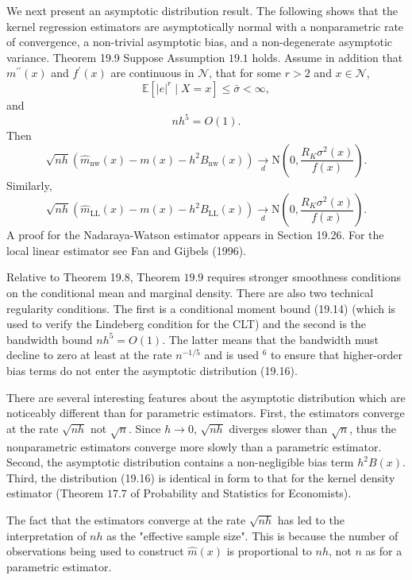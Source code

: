 \documentclass[10pt]{article}
\begin{document}
We next present an asymptotic distribution result. The following shows that the kernel regression estimators are asymptotically normal with a nonparametric rate of convergence, a non-trivial asymptotic bias, and a non-degenerate asymptotic variance. Theorem 19.9 Suppose Assumption $19.1$ holds. Assume in addition that $m^{\prime \prime}(x)$ and $f^{\prime}(x)$ are continuous in $\mathscr{N}$, that for some $r>2$ and $x \in \mathscr{N}$,
$$
\mathbb{E}\left[|e|^{r} \mid X=x\right] \leq \bar{\sigma}<\infty,
$$
and
$$
n h^{5}=O(1) .
$$
Then
$$
\sqrt{n h}\left(\widehat{m}_{\mathrm{nw}}(x)-m(x)-h^{2} B_{\mathrm{nw}}(x)\right) \underset{d}{\longrightarrow} \mathrm{N}\left(0, \frac{R_{K} \sigma^{2}(x)}{f(x)}\right) .
$$
Similarly,
$$
\sqrt{n h}\left(\widehat{m}_{\mathrm{LL}}(x)-m(x)-h^{2} B_{\mathrm{LL}}(x)\right) \underset{d}{\longrightarrow} \mathrm{N}\left(0, \frac{R_{K} \sigma^{2}(x)}{f(x)}\right) .
$$
A proof for the Nadaraya-Watson estimator appears in Section 19.26. For the local linear estimator see Fan and Gijbels (1996).

Relative to Theorem 19.8, Theorem $19.9$ requires stronger smoothness conditions on the conditional mean and marginal density. There are also two technical regularity conditions. The first is a conditional moment bound (19.14) (which is used to verify the Lindeberg condition for the CLT) and the second is the bandwidth bound $n h^{5}=O(1)$. The latter means that the bandwidth must decline to zero at least at the rate $n^{-1 / 5}$ and is used ${ }^{6}$ to ensure that higher-order bias terms do not enter the asymptotic distribution (19.16).

There are several interesting features about the asymptotic distribution which are noticeably different than for parametric estimators. First, the estimators converge at the rate $\sqrt{n h}$ not $\sqrt{n}$. Since $h \rightarrow 0$, $\sqrt{n h}$ diverges slower than $\sqrt{n}$, thus the nonparametric estimators converge more slowly than a parametric estimator. Second, the asymptotic distribution contains a non-negligible bias term $h^{2} B(x)$. Third, the distribution (19.16) is identical in form to that for the kernel density estimator (Theorem $17.7$ of Probability and Statistics for Economists).

The fact that the estimators converge at the rate $\sqrt{n h}$ has led to the interpretation of $n h$ as the "effective sample size". This is because the number of observations being used to construct $\widehat{m}(x)$ is proportional to $n h$, not $n$ as for a parametric estimator.
\end{document}
